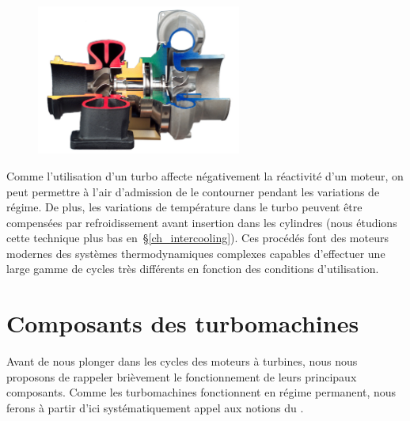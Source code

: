 		\begin{figure}
			\begin{center}
				\includegraphics[width=0.6\textwidth]{images/coupe_turbo.jpg}
			\end{center}
			\label{fig_turbo}
		\end{figure}
		
		Comme l’utilisation d’un turbo affecte négativement la réactivité d’un moteur, on peut permettre à l’air d’admission de le contourner pendant les variations de régime. De plus, les variations de température dans le turbo peuvent être compensées par refroidissement avant insertion dans les cylindres (nous étudions cette technique plus bas en~\S\ref{ch_intercooling}). Ces procédés font des moteurs modernes des systèmes thermodynamiques complexes capables d’effectuer une large gamme de cycles très différents en fonction des conditions d’utilisation.

\onlyframabook{\clearpage}%
\section{Composants des turbomachines}

	Avant de nous plonger dans les cycles des moteurs à turbines, nous nous proposons de rappeler brièvement le fonctionnement de leurs principaux composants. Comme les turbomachines fonctionnent en régime permanent, nous ferons à partir d’ici systématiquement appel aux notions du \courstrois.

